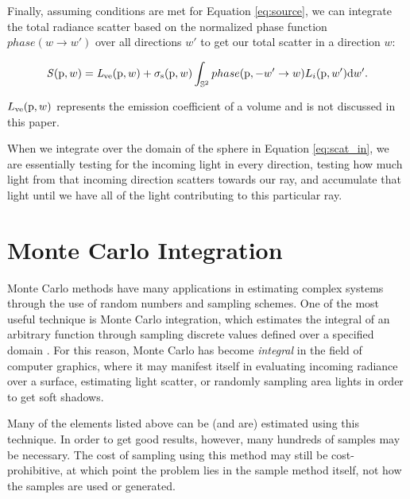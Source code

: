 Finally, assuming conditions are met for Equation \ref{eq:source}, we can integrate the total radiance scatter based on the normalized phase function $phase(w \to w')$ over all directions $w'$ to get our total scatter in a direction $w$:

\begin{equation}
\mathit{S}(\textup{p},w) = \mathit{L}_{\textup{ve}}(\textup{p},w) + \sigma_{\textup{s}}(\textup{p}, w) \int_{\mathbb{S}^2} phase(\textup{p}, -w' \to w) L_{i}(\textup{p},w')\textup{d}w'.
\label{eq:scat_in}
\end{equation}

$L_{\textup{ve}}(\textup{p}, w)$ represents the emission coefficient of a volume and is not discussed in this paper.

When we integrate over the domain of the sphere in Equation \ref{eq:scat_in}, we are essentially testing for the incoming light in every direction, testing how much light from that incoming direction scatters towards our ray, and accumulate that light until we have all of the light contributing to this particular ray.


\section{Monte Carlo Integration}

Monte Carlo methods have many applications in estimating complex systems through the use of random numbers and sampling schemes.  One of the most useful technique is Monte Carlo integration, which estimates the integral of an arbitrary function through sampling discrete values defined over a specified domain \cite{aga}.  For this reason, Monte Carlo has become \textit{integral} in the field of computer graphics, where it may manifest itself in evaluating incoming radiance over a surface, estimating light scatter, or randomly sampling area lights in order to get soft shadows.

Many of the elements listed above can be (and are) estimated using this technique.  In order to get good results, however, many hundreds of samples may be necessary.  The cost of sampling using this method may still be cost-prohibitive, at which point the problem lies in the sample method itself, not how the samples are used or generated.


